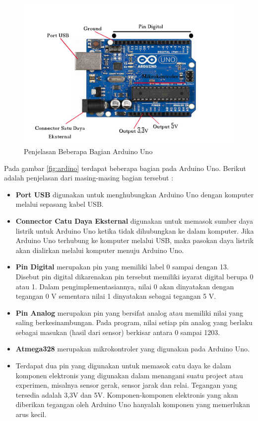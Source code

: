\begin{figure}[!htbp]
\centering
\includegraphics[width=.75\textwidth]{figures/HRD/arduino.jpg}
\caption{Penjelasan Beberapa Bagian Arduino Uno}\label{fig:arduino}
\end{figure}

Pada gambar \ref{fig:ardino} terdapat beberapa bagian pada Arduino Uno. Berikut adalah penjelasan dari masing-masing bagian tersebut :
\begin{itemize}
\item \textbf{Port USB} digunakan untuk menghubungkan Arduino Uno dengan komputer melalui sepasang kabel USB.
\item \textbf{Connector Catu Daya Eksternal} digunakan untuk memasok sumber daya listrik untuk Arduino Uno ketika tidak dihubungkan ke dalam komputer. Jika Arduino Uno terhubung ke komputer melalui USB, maka pasokan daya listrik akan dialirkan melalui komputer menuju Arduino Uno.
\item \textbf{Pin Digital} merupakan pin yang memiliki label 0 sampai dengan 13. Disebut pin digital dikarenakan pin tersebut memiliki isyarat digital berupa 0 atau 1. Dalam pengimplementasiannya, nilai 0 akan dinyatakan dengan tegangan 0 V sementara nilai 1 dinyatakan sebagai tegangan 5 V.    
\item \textbf{Pin Analog} merupakan pin yang bersifat analog atau memiliki nilai yang saling berkesinambungan. Pada program, nilai setiap pin analog yang berlaku sebagai masukan (hasil dari sensor) berkisar antara 0 sampai 1203.
\item \textbf{Atmega328} merupakan mikrokontroler yang digunakan pada Arduino Uno.
\item Terdapat dua pin yang digunakan untuk memasok catu daya ke dalam komponen elektronis yang digunakan dalam menangani suatu project atau experimen, misalnya sensor gerak, sensor jarak dan relai. Tegangan yang tersedia adalah 3,3V dan 5V. Komponen-komponen elektronis yang akan diberikan tegangan oleh Arduino Uno hanyalah komponen yang memerlukan arus kecil.
\end{itemize}   

